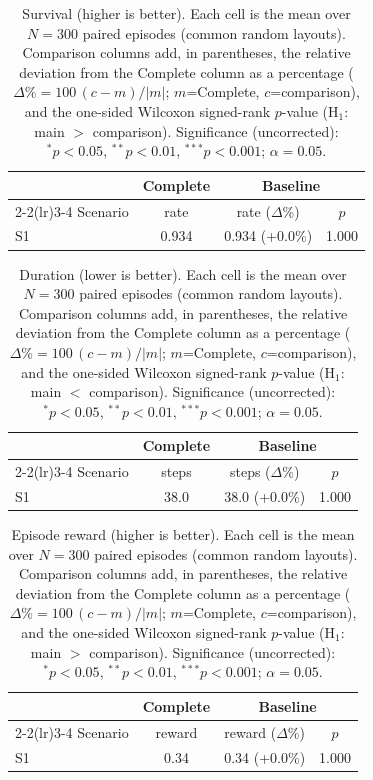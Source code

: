 \begin{table}[ht]
  \centering
  \caption{Survival (higher is better). Each cell is the mean over $N=300$ paired episodes (common random layouts). Comparison columns add, in parentheses, the relative deviation from the Complete column as a percentage ($\Delta\%=100\,(c-m)/|m|$; $m$=Complete, $c$=comparison), and the one-sided Wilcoxon signed-rank $p$-value (H$_1$: main $>$ comparison). Significance (uncorrected): $^{*}p<0.05$, $^{**}p<0.01$, $^{***}p<0.001$; $\alpha=0.05$.}
  \label{tab:wilcoxon-survival}
  \small
  \begin{tabular}{l c cc}
    \toprule
     & Complete & \multicolumn{2}{c}{Baseline} \\
    \cmidrule(lr){2-2}\cmidrule(lr){3-4}
    Scenario & {rate} & {rate ($\Delta$\%)} & {$p$} \\
    \midrule
    S1 & 0.934 & 0.934 (+0.0\%) & 1.000 \\
    \bottomrule
  \end{tabular}
\end{table}

\begin{table}[ht]
  \centering
  \caption{Duration (lower is better). Each cell is the mean over $N=300$ paired episodes (common random layouts). Comparison columns add, in parentheses, the relative deviation from the Complete column as a percentage ($\Delta\%=100\,(c-m)/|m|$; $m$=Complete, $c$=comparison), and the one-sided Wilcoxon signed-rank $p$-value (H$_1$: main $<$ comparison). Significance (uncorrected): $^{*}p<0.05$, $^{**}p<0.01$, $^{***}p<0.001$; $\alpha=0.05$.}
  \label{tab:wilcoxon-duration}
  \small
  \begin{tabular}{l c cc}
    \toprule
     & Complete & \multicolumn{2}{c}{Baseline} \\
    \cmidrule(lr){2-2}\cmidrule(lr){3-4}
    Scenario & {steps} & {steps ($\Delta$\%)} & {$p$} \\
    \midrule
    S1 & 38.0 & 38.0 (+0.0\%) & 1.000 \\
    \bottomrule
  \end{tabular}
\end{table}

\begin{table}[ht]
  \centering
  \caption{Episode reward (higher is better). Each cell is the mean over $N=300$ paired episodes (common random layouts). Comparison columns add, in parentheses, the relative deviation from the Complete column as a percentage ($\Delta\%=100\,(c-m)/|m|$; $m$=Complete, $c$=comparison), and the one-sided Wilcoxon signed-rank $p$-value (H$_1$: main $>$ comparison). Significance (uncorrected): $^{*}p<0.05$, $^{**}p<0.01$, $^{***}p<0.001$; $\alpha=0.05$.}
  \label{tab:wilcoxon-reward}
  \small
  \begin{tabular}{l c cc}
    \toprule
     & Complete & \multicolumn{2}{c}{Baseline} \\
    \cmidrule(lr){2-2}\cmidrule(lr){3-4}
    Scenario & {reward} & {reward ($\Delta$\%)} & {$p$} \\
    \midrule
    S1 & 0.34 & 0.34 (+0.0\%) & 1.000 \\
    \bottomrule
  \end{tabular}
\end{table}
